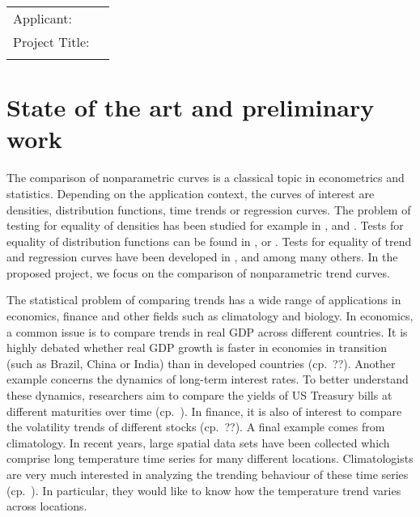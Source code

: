 \documentclass[a4paper,12pt]{article}
\begin{document}
 
\vspace{0.25cm}

\noindent \hrulefill
\vspace{0.5cm}

\noindent\begin{tabular}{ll}
\large{Applicant:} & \noindent {\large Michael Vogt, University of Bonn} \\[0.1cm]
\large{Project Title:} & \noindent {\large New Methods and Theory for the Comparison of} \\
 & \noindent {\large Nonparametric Trend Curves}
\end{tabular}
\vspace{0.5cm}

\noindent \hrulefill



\section{State of the art and preliminary work}\label{sec:stateofart}


The comparison of nonparametric curves is a classical topic in econometrics and statistics. Depending on the application context, the curves of interest are densities, distribution functions, time trends or regression curves. The problem of testing for equality of densities has been studied for example in \cite{Anderson1994},\linebreak \cite{Li1996} and \cite{Mammen2012}. Tests for equality of distribution functions can be found in \cite{Kiefer1959}, \cite{Hogg1962} or \cite{Li2009}. Tests for equality of trend and regression curves have been developed in \cite{Hall1990}, \cite{Delgado1993} and \cite{Young1995} among many others. In the proposed project, we focus on the comparison of nonparametric trend curves.


The statistical problem of comparing trends has a wide range of applications in economics, finance and other fields such as climatology and biology. In economics, a common issue is to compare trends in real GDP across different countries. It is highly debated whether real GDP growth is faster in economies in transition (such as Brazil, China or India) than in developed countries (cp.\ ??). Another example concerns the dynamics of long-term interest rates. To better understand these dynamics, researchers aim to compare the yields of US Treasury bills at different maturities over time (cp.\ \cite{Park2009}). In finance, it is also of interest to compare the volatility trends of different stocks (cp.\ ??). A final example comes from climatology. In recent years, large spatial data sets have been collected which comprise long temperature time series for many different locations. Climatologists are very much interested in analyzing the trending behaviour of these time series (cp.\ \cite{Mudelsee2018}). In particular, they would like to know how the temperature trend varies across locations. 
\end{document}
